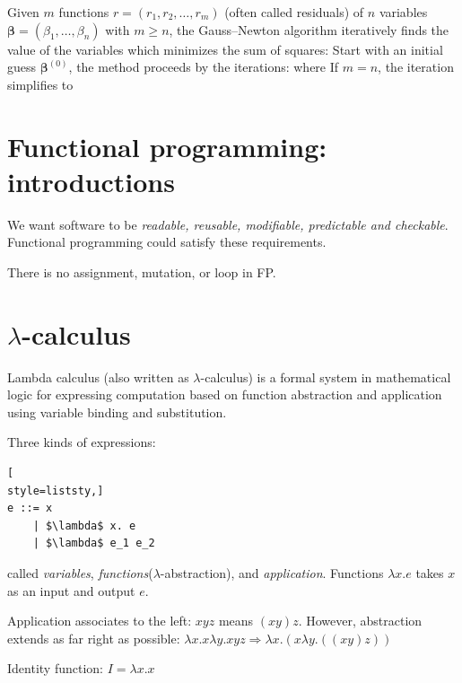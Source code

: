 Given $m$ functions $r = (r_1, r_2, \dots, r_m)$ (often called residuals) of $n$ variables $\mathbf{\beta} = (\beta_1, \dots, \beta_n)$ with $m \geq n$, the Gauss–Newton algorithm iteratively finds the value of the variables which minimizes the sum of squares:
Start with an initial guess $\mathbf{\beta}^{(0)}$, the method proceeds by the iterations:
where 
If $m = n$, the iteration simplifies to 


\section{Functional programming: introductions} 

We want software to be \textit{readable, reusable, modifiable, predictable and checkable}. Functional
programming could satisfy these requirements. 

There is no assignment, mutation, or loop in FP.

\section{$\lambda$-calculus}
Lambda calculus (also written as $\lambda$-calculus) is a formal system in mathematical logic for expressing computation
 based on function abstraction and application using variable binding and substitution.

Three kinds of expressions:
\begin{lstlisting}[
style=liststy,] 
e ::= x             
    | $\lambda$ x. e      
    | $\lambda$ e_1 e_2   
\end{lstlisting}
called \textit{variables}, \textit{functions}($\lambda$-abstraction), and \textit{application}.
Functions $\lambda x. e$ takes $x$ as an input and output $e$.
 
Application associates to the left: $x y z$ means $(x y) z$. However, abstraction extends as far right
as possible:
$\lambda x. x \lambda y. x y z \Rightarrow \lambda x. (x \lambda y. ((x y) z))$ 

Identity function: $I = \lambda x. x$

